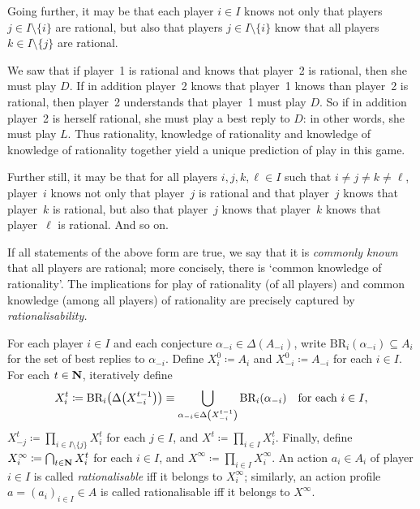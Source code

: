 Going further, it may be that each player $i \in I$ knows not only that players $j \in I \setminus \{i\}$ are rational, but also that players $j \in I \setminus \{i\}$ know that all players $k \in I \setminus \{j\}$ are rational.

\addtocounter{example}{-2}
\begin{example}[continued]
	\label{example:rbty_neverbest_rbty1}
	We saw that if player~1 is rational and knows that player~2 is rational, then she must play $D$. If in addition player~2 knows that player~1 knows than player~2 is rational, then player~2 understands that player~1 must play $D$. So if in addition player~2 is herself rational, she must play a best reply to $D$: in other words, she must play $L$. Thus rationality, knowledge of rationality and knowledge of knowledge of rationality together yield a unique prediction of play in this game.
\end{example}
\addtocounter{example}{1}

Further still, it may be that for all players $i,j,k,\ell \in I$ such that $i \neq j \neq k \neq \ell$, player~$i$ knows not only that player~$j$ is rational and that player~$j$ knows that player~$k$ is rational, but also that player~$j$ knows that player~$k$ knows that player~$\ell$ is rational. And so on.

If all statements of the above form are true, we say that it is \emph{commonly known} that all players are rational; more concisely, there is `common knowledge of rationality'. The implications for play of rationality (of all players) and common knowledge (among all players) of rationality are precisely captured by \emph{rationalisability.}

\begin{definition}
	\label{definition:rbty}
	For each player $i \in I$ and each conjecture $\alpha_{-i} \in \Delta(A_{-i})$, write $\text{BR}_i(\alpha_{-i}) \subseteq A_i$ for the set of best replies to $\alpha_{-i}$.
	Define $X^0_i \coloneqq A_i$ and $X^0_{-i} \coloneqq A_{-i}$ for each $i \in I$.
	For each $t \in \mathbf{N}$, iteratively define
	\begin{equation*}
		X^t_i \coloneqq \text{BR}_i\left( \Delta\left( X^{t-1}_{-i} \right) \right)
		\equiv \Union_{\alpha_{-i} \in \Delta\left( X^{t-1}_{-i} \right)} \text{BR}_i(\alpha_{-i})
		\quad \text{for each $i \in I$,}
	\end{equation*}
	$X^t_{-j} \coloneqq \prod_{i \in I \setminus \{j\}} X^t_i$ for each $j \in I$, and $X^t \coloneqq \prod_{i \in I} X^t_i$.
	Finally, define $X^\infty_i \coloneqq \bigcap_{t \in \mathbf{N}} X^t_i$ for each $i \in I$, and $X^\infty \coloneqq \prod_{i \in I} X^\infty_i$. An action $a_i \in A_i$ of player $i \in I$ is called \emph{rationalisable} iff it belongs to $X^\infty_i$; similarly, an action profile $a = (a_i)_{i \in I} \in A$ is called rationalisable iff it belongs to $X^\infty$.
\end{definition}

